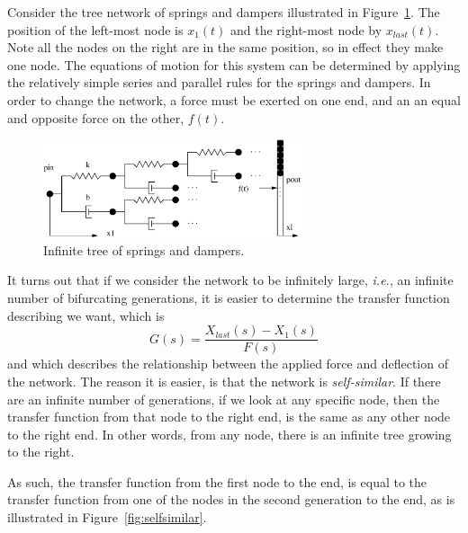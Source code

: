 \begin{example}
  Consider the tree network of springs and dampers illustrated in Figure~\ref{fig:structure}. The position of the left-most node is $x_1(t)$ and the right-most node by $x_{last}(t)$. Note all the nodes on the right are in the same position, so in effect they make one node. The equations of motion for this system can be determined by applying the relatively simple series and parallel rules for the springs and dampers. In order to change the network, a force must be exerted on one end, and an an equal and opposite force on the other, $f(t)$.

  \begin{figure}
    \centering
    \includegraphics[width=3in]{figs/structure}
    \caption{Infinite tree of springs and dampers.}
    \label{fig:structure}
  \end{figure}
\end{example}

It turns out that if we consider the network to be infinitely large, \textit{i.e.}, an infinite number of bifurcating generations, it is easier to determine the transfer function describing we want, which is
\begin{equation}
  G(s) = \frac{X_{last}(s) - X_1(s)}{F(s)}
  \label{eq:xfer}
\end{equation}
and which describes the relationship between the applied force and deflection of the network. The reason it is easier, is that the network is \emph{self-similar}. If there are an infinite number of generations, if we look at any specific node, then the transfer function from that node to the right end, is the same as any other node to the right end. In other words, from any node, there is an infinite tree growing to the right. 

As such, the transfer function from the first node to the end, is equal to the transfer function from one of the nodes in the second generation to the end, as is illustrated in Figure~\ref{fig:selfsimilar}.

